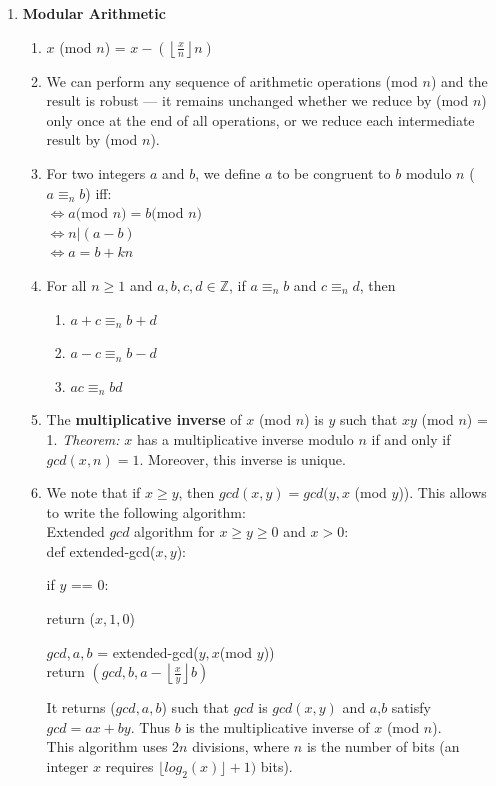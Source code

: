 \documentclass[10pt]{article}
\begin{document}
\begin{multicols}{2}
\begin{enumerate}
    \item \textbf{Modular Arithmetic} 
    \begin{enumerate}
        \item $x$ (mod $n$) = $x - (\left \lfloor{\frac{x}{n}}\right \rfloor n)$
        \item We can perform any sequence of arithmetic operations (mod $n$) and the result is robust — it remains unchanged whether we reduce by (mod $n$) only once at the end of all operations, or we reduce each intermediate result by (mod $n$).
        \item For two integers $a$ and $b$, we define $a$ to be congruent to $b$ modulo $n$ ($a \equiv_n b$) iff: \\
            $\iff a ($mod $n) = b ($mod $n)$ \\ $\iff n | (a-b)$ \\ $\iff a = b+kn$
        \item For all $n \geq 1$ and $a,b,c,d \in \mathbb{Z}$, if $a \equiv_n b$ and $c \equiv_n d$, then
        \begin{enumerate}
            \item $a + c \equiv_n b + d$
            \item $a - c \equiv_n b - d$
            \item $ac \equiv_n bd$
        \end{enumerate}
        \item The \textbf{multiplicative inverse} of $x$ (mod $n$) is $y$ such that $xy$ (mod $n$) = 1. \textit{Theorem:} $x$ has a multiplicative inverse modulo $n$ if and only if $gcd(x,n)=1$. Moreover, this inverse is unique.
        \item We note that if $x \geq y$, then $gcd(x,y)=gcd(y, x$ (mod $y$)). This allows to write the following algorithm: \\ 
        Extended $gcd$ algorithm for $x \geq y \geq 0$ and $x > 0$: \\
        def extended-gcd($x,y$): 
        \begin{addmargin}[2em]{1em}
            if $y$ == 0:
            \begin{addmargin}[2em]{1em}
                return ($x, 1, 0$) 
            \end{addmargin}
            $gcd, a, b$ = extended-gcd($y, x $(mod $y$)) \\
            return $(gcd, b, a - \left \lfloor{\frac{x}{y}}\right \rfloor b)$
        \end{addmargin} 
        It returns ($gcd, a, b$) such that $gcd$ is $gcd(x,y)$ and $a$,$b$ satisfy $gcd = ax + by$. Thus $b$ is the multiplicative inverse of $x$ (mod $n$). \\
        This algorithm uses $2n$ divisions, where $n$ is the number of bits (an integer $x$ requires $\lfloor{log_2(x)} \rfloor+1)$ bits).
    \end{enumerate}
    

\end{enumerate}
\end{multicols}
\end{document}
